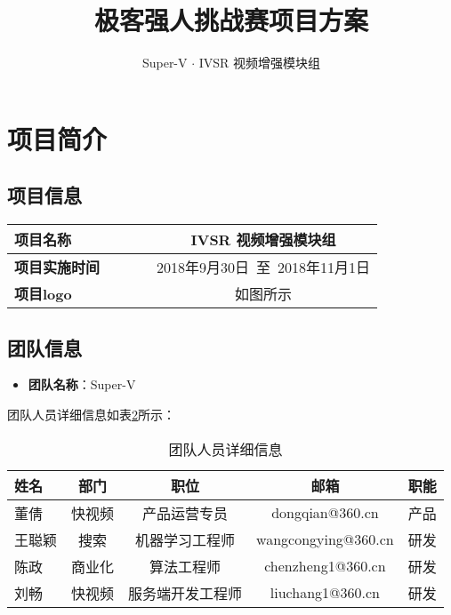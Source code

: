 \documentclass[UTF8]{ctexart}
\title{极客强人挑战赛项目方案}
\author{Super-V $\cdot$ IVSR 视频增强模块组}
\begin{document}
\maketitle
\newpage
\tableofcontents
\newpage

\section{项目简介}
\subsection{项目信息}
\begin{table}[thbp!]
\begin{center}
\begin{tabular}{l|cccc}

  \hline
 \textbf{项目名称} & &&& \textbf{IVSR 视频增强模块组} \\
  \hline
  \textbf{项目实施时间} & &&&2018年9月30日~至~2018年11月1日 \\
  \hline 
  \textbf{项目logo} & &&& 如图所示 \\
  \hline
\end{tabular}
\end{center}
\label{tb:xiangMuXinXi}
\end{table}

\subsection{团队信息}
\begin{itemize}
  \item \textbf{团队名称}：Super-V
\end{itemize}
团队人员详细信息如表\ref{tb:duiYuan}所示：
\begin{table}[thbp!]
\caption{团队人员详细信息}
\begin{center}
\begin{tabular}{l|cccc}
\hline
姓名&部门&职位&邮箱&职能 \\
\hline 
董倩&快视频&产品运营专员&dongqian@360.cn&产品 \\
王聪颖&搜索&机器学习工程师&wangcongying@360.cn&研发 \\
陈政&商业化&算法工程师&chenzheng1@360.cn&研发 \\
刘畅&快视频&服务端开发工程师&liuchang1@360.cn&研发 \\
\hline 
\end{tabular}
\end{center}
\label{tb:duiYuan}
\end{table}
\end{document}

